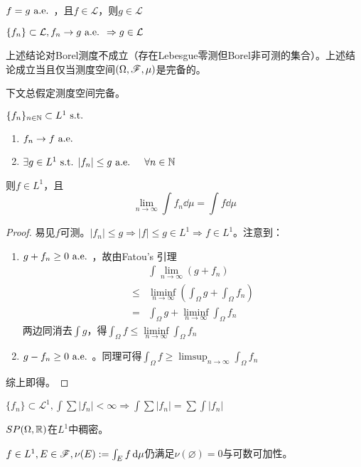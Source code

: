 \documentclass{ctexbook}
\begin{document}
\begin{Rmk}
  $f=g\text{ a.e. }$，且$f\in\mathcal{L}$，则$g\in\mathcal{L}$

  $\{f_{n}\}\subset \mathcal{L},f_{n}\to g\text{ a.e. }\Rightarrow g\in \mathcal{L}$

  上述结论对Borel测度不成立（存在Lebesgue零测但Borel非可测的集合）。上述结论成立当且仅当测度空间$(\Omega,\mathscr{F},\mu)$是完备的。
\end{Rmk}

下文总假定测度空间完备。

\begin{Thm}
  $\{f_{n}\}_{n\in\mathbb{N}}\subset L^{1}\text{ s.t. }$
  \begin{enumerate}
  \item $f_{n}\to f\text{ a.e. }$
  \item $\exists g\in L^{1}\text{ s.t. } |f_{n}|\leq g\text{ a.e. }\quad\forall n\in\mathbb{N}$
  \end{enumerate}
  则$f\in L^{1}$，且\[\lim_{n\to\infty}\int f_{n}\dd\mu=\int f\dd\mu\]
\end{Thm}

\begin{proof}
  易见$f$可测。$|f_{n}|\leq g\Rightarrow |f|\leq g\in L^{1}\Rightarrow f\in L^{1}$。注意到：
  \begin{enumerate}
  \item $g+f_{n}\geq 0\text{ a.e. }$，故由Fatou's 引理
    \begin{align*}
      &\int \lim_{n\to\infty}(g+f_{n})\\
      \leq &\liminf_{n\to\infty}(\int_{\Omega}g+\int_{\Omega}f_{n})\\
      =&\int_{\Omega}g+\liminf_{n\to\infty}\int_{\Omega}f_{n}
      \end{align*}
    两边同消去$\int g$，得$\int_{\Omega}f\leq\liminf\limits_{n\to\infty}\int_{\Omega}f_{n}$
  \item $g-f_{n}\geq 0\text{ a.e. }$。同理可得$\int_{\Omega}f\geq\limsup_{n\to\infty}\int_{\Omega}f_{n}$
  \end{enumerate}
  综上即得。
\end{proof}

\begin{Eg}
  $\{f_{n}\}\subset \mathcal L^{1},\int\sum|f_{n}|<\infty\Rightarrow \int\sum|f_{n}|=\sum\int|f_{n}|$
\end{Eg}
\begin{Eg}
  $SP(\Omega,\mathbb{R})$在$L^{1}$中稠密。
\end{Eg}

\begin{Eg}[符号测度]
  $f\in L^{1},E\in\mathscr{F},\nu(E):=\int_{E}f\,\mathrm{d}\mu$仍满足$\nu(\varnothing)=0$与可数可加性。
\end{Eg}
\end{document}
